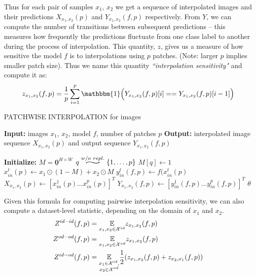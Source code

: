 Thus for each pair of samples $x_1$, $x_2$ we get a sequence of interpolated images and their predictions $X_{x_1, x_2}(p)$ and $Y_{x_1, x_2}(f, p)$ respectively.
From $Y$, we can compute the number of transitions between subsequent predictions -- this measures how frequently the predictions fluctuate from one class label to another during the process of interpolation.
This quantity, $z$, gives us a measure of how sensitive the model $f$ is to interpolations using $p$ patches.
(Note: larger $p$ implies smaller patch size).
Thus we name this quantity \textit{``interpolation sensitivity"} and compute it as:
\begin{equation}
    z_{x_1, x_2} (f, p) = \frac{1}{p}\sum_{i=1}^{p}\mathbbm{1}\Big( Y_{x_1, x_2}(f, p)[i] == Y_{x_1, x_2}(f, p)[i-1]\Big)
\end{equation}

\begin{algorithm}
    \caption{PATCHWISE INTERPOLATION for images}
    \begin{algorithmic}[0]
        \State \textbf{Input:} images $x_1$, $x_2$, model $f$, number of patches $p$
        \State \textbf{Output:} interpolated image sequence $X_{x_1, x_2}(p)$ and output sequence $Y_{x_1, x_2}(f, p)$
    \end{algorithmic}
    \begin{algorithmic}[1]
        \State \textbf{Initialize:} $M = \underline{\mathbf{0}}^{H\times W}$ 
            \State $q \widesim[3]{w/o~repl.} \{1, \dots, p\}$ 
            \State $M[q] \gets 1$ 
            \State $x_{in}^t (p) \gets x_1\odot (1-M) + x_2\odot M$ 
            \State $y_{in}^t (f, p) \gets f(x_{in}^t (p) $ 
        \EndForEach
        \State $X_{x_1, x_2} (p) \gets [x_{in}^1(p) \dots x_{in}^p(p)]^T$
        \State $Y_{x_1, x_2} (f, p) \gets [y_{in}^1(f,p) \dots y_{in}^p(f,p)]^T$
        \State\Return $\theta$
\end{algorithmic}
\label{algo:patchwise_interpolation}
\end{algorithm}



Given this formula for computing pairwise interpolation sensitivity, we can also compute a dataset-level statistic, depending on the domain of $x_1$ and $x_2$.
\begin{align}
    Z^{id-id} (f, p) &= \underset{x_1, x_2 \in \mathcal{X}^{id}}{\operatorname*{\mathbb{E}}} z_{x_1, x_2}(f, p) \\
    Z^{od-od} (f, p) &= \underset{x_1, x_2 \in \mathcal{X}^{od}}{\operatorname*{\mathbb{E}}} z_{x_1, x_2}(f, p) \\
    Z^{id-od} (f, p) &= \underset{\substack{x_1 \in \mathcal{X}^{id},\\ x_2\in\mathcal{X}^{od}}}{\operatorname*{\mathbb{E}}} \frac{1}{2}(z_{x_1, x_2}(f, p) + z_{x_2, x_1}(f, p))
    \label{eq:expected_sensitivity}
\end{align}

